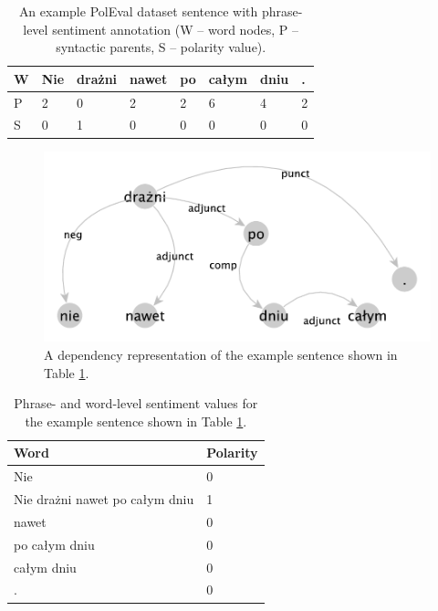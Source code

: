 \documentclass[10pt, a4paper]{article}
\begin{document}
\begin{table}[h]
 \begin{center}
\begin{tabular}{|l| l l l l l l l|}
      \hline
      W & Nie & drażni & nawet & po & całym & dniu & . \\
      \hline
      P & 2 & 0 & 2 & 2 & 6 & 4 & 2 \\
      \hline
      S & 0 & 1 & 0 & 0 & 0 & 0 & 0 \\
      \hline
\end{tabular}
\caption{An example PolEval dataset sentence with phrase-level sentiment annotation (W -- word nodes, P -- syntactic parents, S -- polarity value).}
\label{tab:nie_drazni_1}
 \end{center}
\end{table}



\begin{figure}
  \includegraphics[width=\linewidth]{imgs/nie_drazni.pdf}
  \caption{A dependency representation of the example sentence shown in Table \ref{tab:nie_drazni_1}.}
  \label{fig:boat1}
\end{figure}

\begin{table}[h]
 \begin{center}
\begin{tabular}{|l | l|}

\hline
 Word &	Polarity\\
      \hline
     Nie &	0\\
     \hline
Nie drażni nawet po całym dniu	 & 1\\
\hline
nawet &	0\\
\hline
po całym dniu &	0\\
\hline
całym dniu &	0\\
\hline
.	& 0\\
      \hline
\end{tabular}
\caption{Phrase- and word-level sentiment values for the example sentence shown in Table \ref{tab:nie_drazni_1}.}
\label{tab:nie_drazni_2}
 \end{center}
\end{table}
\end{document}
